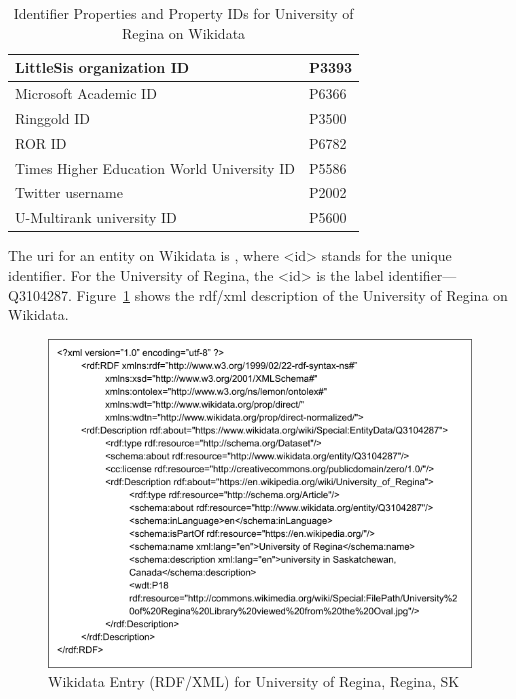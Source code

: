 \begin{doublespace}
\begin{itemize}
\begin{table}[h!]
\begin{tabular}{|l|l|}
     LittleSis organization ID & P3393\\ \hline
     Microsoft Academic ID & P6366\\ \hline
     Ringgold ID & P3500\\ \hline
     ROR ID & P6782\\ \hline
     Times Higher Education World University ID & P5586\\ \hline
     Twitter username & P2002\\ \hline
     U-Multirank university ID & P5600\\ \hline
    \end{tabular}
    \caption{Identifier Properties and Property IDs for University of Regina on Wikidata}
    \label{table:2.6}
    \end{table}
\end{itemize}
\par The \ac{uri} for an entity on Wikidata is , where <id> stands for the unique identifier. For the University of Regina, the <id> is the label identifier—Q3104287. Figure~\ref{fig:2.17} shows the \ac{rdf}/\ac{xml} description of the University of Regina on Wikidata.
\begin{figure}[htp]
    \centering
    \includegraphics[width=15cm]{images/ch2/Figure17.png}
    \caption{Wikidata Entry (RDF/XML) for University of Regina, Regina, SK}
    \label{fig:2.17}
\end{figure}

\end{doublespace}
